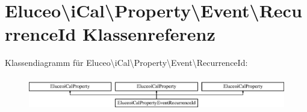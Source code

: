 \hypertarget{class_eluceo_1_1i_cal_1_1_property_1_1_event_1_1_recurrence_id}{}\section{Eluceo\textbackslash{}i\+Cal\textbackslash{}Property\textbackslash{}Event\textbackslash{}Recurrence\+Id Klassenreferenz}
\label{class_eluceo_1_1i_cal_1_1_property_1_1_event_1_1_recurrence_id}
Klassendiagramm für Eluceo\textbackslash{}i\+Cal\textbackslash{}Property\textbackslash{}Event\textbackslash{}Recurrence\+Id\+:\begin{figure}[H]
\begin{center}
\leavevmode
\includegraphics[height=1.464052cm]{class_eluceo_1_1i_cal_1_1_property_1_1_event_1_1_recurrence_id}
\end{center}
\end{figure}
